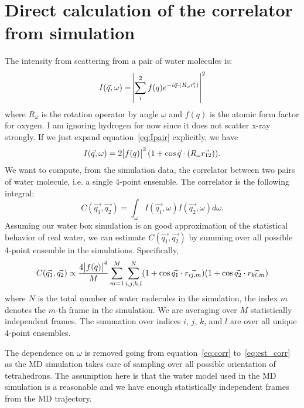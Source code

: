 \documentclass[20pt]{article}
\begin{document}
\section{Direct calculation of the correlator from simulation}
The intensity from scattering from a pair of water molecules is:
\begin{equation} \label{eq:Ipair}
I(\vec{q},\omega) = \abs{\sum_{i}^{2} f(q) e^{-i \vec{q} \cdot (R_{\omega} \vec{r_i})}}^2
\end{equation}
where $R_{\omega}$ is the rotation operator by angle $\omega$ and $f(q)$ is the atomic form factor for oxygen. I am ignoring hydrogen for now since it does not scatter x-ray strongly. If we just expand equation~\ref{eq:Ipair} explicitly, we have
\begin{equation} \label{eq:Ipair_exp}
I(\vec{q},\omega) = 2\abs{f(q)}^2 (1+\cos{\vec{q} \cdot (R_{\omega} \vec{r_{12}})} ).
\end{equation}
We want to compute, from the simulation data, the correlator between two pairs of water molecule, i.e. a single 4-point ensemble. The correlator is the following integral:
\begin{equation} \label{eq:corr}
C(\vec{q_1}, \vec{q_2}) = \int_{\omega} I(\vec{q_1},\omega) I(\vec{q_2},\omega) d\omega.
\end{equation}
Assuming our water box simulation is an good approximation of the statistical behavior of real water, we can estimate $C(\vec{q_1}, \vec{q_2})$ by summing over all possible 4-point ensemble in the simulations. Specifically,
\begin{equation} \label{eq:est_corr}
C(\vec{q_1}, \vec{q_2})  \propto \frac{ 4 \abs{f(q)}^4 }{M} \sum_{m=1}^{M} \sum^{N}_{i,j,k,l}  (1+\cos{\vec{q_1} \cdot \vec{r_{ij,m}}} ) (1+\cos{\vec{q_2} \cdot \vec{r_{kl,m}}} )
\end{equation}
where $N$ is the total number of water molecules in the simulation, the index $m$ denotes the $m$-th frame in the simulation. We are averaging over $M$ statistically independent frames. The summation over indices $i$, $j$, $k$, and $l$ are over all unique 4-point ensembles.

The dependence on $\omega$ is removed going from equation~\ref{eq:corr} to~\ref{eq:est_corr} as the MD simulation takes care of sampling over all possible orientation of tetrahedrons. The assumption here is that the water model used in the MD simulation is a reasonable and we have enough statistically independent frames from the MD trajectory. 
\end{document}
